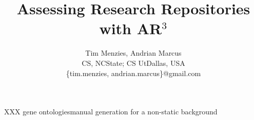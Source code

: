 \documentclass[journal]{IEEEtran}
\begin{document}
 
 
 
\newcommand{\IT}{{\textsf{{AR$^3$}}}}
\title{Assessing Research Repositories with {\IT}}%

\author{ Tim Menzies, Andrian Marcus \\
       CS, NCState; CS UtDallas, USA\\
     \{tim.menzies, andrian.marcus\}@gmail.com}
 
\maketitle    
  
%
%
%
%
%
%

XXX gene ontologiesmanual generation for a non-static background
\end{document}
